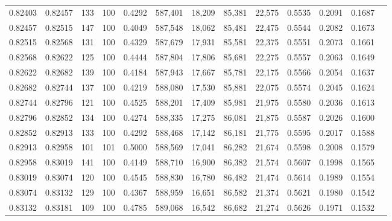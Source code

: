 \begin{tabular}{rrrrrrrrrrrrr}
0.82403 & 0.82457 &   133 & 100 &                                     0.4292 & 587,401 &  18,209 &  85,381 &  22,575 & 0.5535 & 0.2091 & 0.1687 \\
0.82457 & 0.82515 &   147 & 100 &                                     0.4049 & 587,548 &  18,062 &  85,481 &  22,475 & 0.5544 & 0.2082 & 0.1673 \\
0.82515 & 0.82568 &   131 & 100 &                                     0.4329 & 587,679 &  17,931 &  85,581 &  22,375 & 0.5551 & 0.2073 & 0.1661 \\
0.82568 & 0.82622 &   125 & 100 &                                     0.4444 & 587,804 &  17,806 &  85,681 &  22,275 & 0.5557 & 0.2063 & 0.1649 \\
0.82622 & 0.82682 &   139 & 100 &                                     0.4184 & 587,943 &  17,667 &  85,781 &  22,175 & 0.5566 & 0.2054 & 0.1637 \\
0.82682 & 0.82744 &   137 & 100 &                                     0.4219 & 588,080 &  17,530 &  85,881 &  22,075 & 0.5574 & 0.2045 & 0.1624 \\
0.82744 & 0.82796 &   121 & 100 &                                     0.4525 & 588,201 &  17,409 &  85,981 &  21,975 & 0.5580 & 0.2036 & 0.1613 \\
0.82796 & 0.82852 &   134 & 100 &                                     0.4274 & 588,335 &  17,275 &  86,081 &  21,875 & 0.5587 & 0.2026 & 0.1600 \\
0.82852 & 0.82913 &   133 & 100 &                                     0.4292 & 588,468 &  17,142 &  86,181 &  21,775 & 0.5595 & 0.2017 & 0.1588 \\
0.82913 & 0.82958 &   101 & 101 &                                     0.5000 & 588,569 &  17,041 &  86,282 &  21,674 & 0.5598 & 0.2008 & 0.1579 \\
0.82958 & 0.83019 &   141 & 100 &                                     0.4149 & 588,710 &  16,900 &  86,382 &  21,574 & 0.5607 & 0.1998 & 0.1565 \\
0.83019 & 0.83074 &   120 & 100 &                                     0.4545 & 588,830 &  16,780 &  86,482 &  21,474 & 0.5614 & 0.1989 & 0.1554 \\
0.83074 & 0.83132 &   129 & 100 &                                     0.4367 & 588,959 &  16,651 &  86,582 &  21,374 & 0.5621 & 0.1980 & 0.1542 \\
0.83132 & 0.83181 &   109 & 100 &                                     0.4785 & 589,068 &  16,542 &  86,682 &  21,274 & 0.5626 & 0.1971 & 0.1532 \\

\end{tabular}
